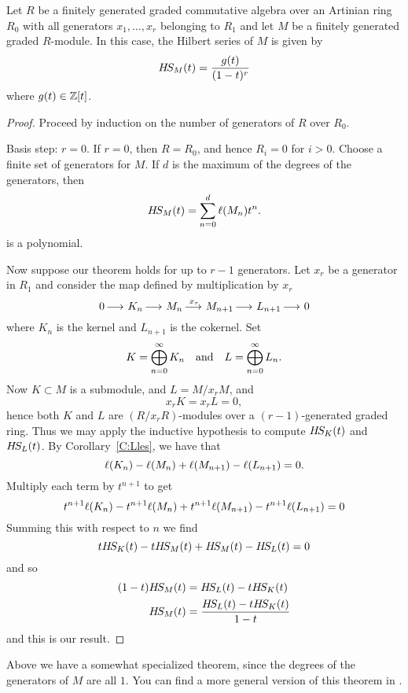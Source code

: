 \documentclass{ximera}
\begin{document}
\begin{theorem}\label{T:HS}
  Let $R$ be a finitely generated graded commutative algebra over an
  Artinian ring $R_0$ with all generators $x_1,\dots,x_r$ belonging to
  $R_1$ and let $M$ be a finitely generated graded $R$-module. In this
  case, the Hilbert series of $M$ is given by
  \[
  H\!S_M(t) = \frac{g(t)}{(1-t)^r}
  \]
  where $g(t)\in\mathbb Z[t]$.
  \begin{proof}
    Proceed by induction on the number of generators of $R$ over
    $R_0$.

    Basis step: $r =0$. If $r=0$, then $R=R_0$, and hence $R_i = 0$
    for $i>0$. Choose a finite set of generators for $M$. If $d$ is
    the maximum of the degrees of the generators, then 
    \[
    H\!S_M(t) = \sum_{n=0}^d \ell(M_n) t^n.
    \]
    is a polynomial.

    Now suppose our theorem holds for up to $r-1$ generators. Let
    $x_r$ be a generator in $R_1$ and consider the map defined by
    multiplication by $x_r$
    \[
    0\mathop{\longrightarrow\,}\limits K_n \mathop{\longrightarrow\,}\limits M_n \mathop{\longrightarrow\,}\limits^{x_r} M_{n+1} \mathop{\longrightarrow\,}\limits L_{n+1}\mathop{\longrightarrow\,}\limits 0 
    \]
    where $K_n$ is the kernel and $L_{n+1}$ is the cokernel. Set
    \[
    K = \bigoplus_{n= 0}^\infty K_n\quad\text{and}\quad L = \bigoplus_{n= 0}^\infty L_n.
    \]
    Now $K\subset M$ is a submodule, and $L = M/x_r M$, and
    \[
    x_r K = x_r L = 0,
    \]
    hence both $K$ and $L$ are $(R/x_r R)$-modules over a
    $(r-1)$-generated graded ring. Thus we may apply the inductive
    hypothesis to compute $H\!S_K(t)$ and $H\!S_L(t)$. By
    Corollary~\ref{C:Lles}, we have that
    \[
    \ell(K_n)-\ell(M_n) + \ell(M_{n+1}) -\ell(L_{n+1}) = 0.
    \]
    Multiply each term by $t^{n+1}$ to get
    \[
    t^{n+1}\ell(K_n)-t^{n+1}\ell(M_n) + t^{n+1}\ell(M_{n+1}) -t^{n+1}\ell(L_{n+1}) = 0
    \]
    Summing this with respect to $n$ we find
    \[
    tH\!S_K(t) - tH\!S_M(t)  + H\!S_M(t) - H\!S_L(t) = 0
    \]
    and so
    \begin{align*}
      (1-t)H\!S_M(t) &= H\!S_L(t) - tH\!S_K(t)\\
      H\!S_M(t) &= \frac{H\!S_L(t) - tH\!S_K(t)}{1-t}
    \end{align*}
    and this is our result.
  \end{proof}
\end{theorem}

\begin{remark}
  Above we have a somewhat specialized theorem, since the degrees of
  the generators of $M$ are all $1$. You can find a more general
  version of this theorem in \cite{AM1969,hM1986}.
\end{remark}
\end{document}
